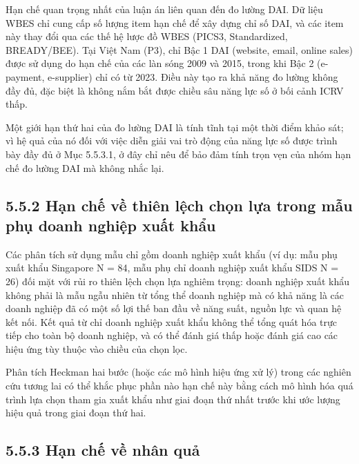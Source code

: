 \documentclass[
  a4paper,
  13pt]{extreport}
\begin{document}
Hạn chế quan trọng nhất của luận án liên quan đến đo lường DAI. Dữ liệu
WBES chỉ cung cấp số lượng item hạn chế để xây dựng chỉ số DAI, và các
item này thay đổi qua các thế hệ lược đồ WBES (PICS3, Standardized,
BREADY/BEE). Tại Việt Nam (P3), chỉ Bậc 1 DAI (website, email, online
sales) được sử dụng do hạn chế của các làn sóng 2009 và 2015, trong khi
Bậc 2 (e-payment, e-supplier) chỉ có từ 2023. Điều này tạo ra khả năng
đo lường không đầy đủ, đặc biệt là không nắm bắt được chiều sâu năng lực
số ở bối cảnh ICRV thấp.

Một giới hạn thứ hai của đo lường DAI là tính tĩnh tại một thời điểm
khảo sát; vì hệ quả của nó đối với việc diễn giải vai trò động của năng
lực số được trình bày đầy đủ ở Mục 5.5.3.1, ở đây chỉ nêu để bảo đảm
tính trọn vẹn của nhóm hạn chế đo lường DAI mà không nhắc lại.

\hypertarget{hux1ea1n-chux1ebf-vux1ec1-thiuxean-lux1ec7ch-chux1ecdn-lux1ef1a-trong-mux1eabu-phux1ee5-doanh-nghiux1ec7p-xuux1ea5t-khux1ea9u}{%
\subsection{5.5.2 Hạn chế về thiên lệch chọn lựa trong mẫu phụ doanh
nghiệp xuất
khẩu}\label{hux1ea1n-chux1ebf-vux1ec1-thiuxean-lux1ec7ch-chux1ecdn-lux1ef1a-trong-mux1eabu-phux1ee5-doanh-nghiux1ec7p-xuux1ea5t-khux1ea9u}}

Các phân tích sử dụng mẫu chỉ gồm doanh nghiệp xuất khẩu (ví dụ: mẫu phụ
xuất khẩu Singapore N = 84, mẫu phụ chỉ doanh nghiệp xuất khẩu SIDS N =
26) đối mặt với rủi ro thiên lệch chọn lựa nghiêm trọng: doanh nghiệp
xuất khẩu không phải là mẫu ngẫu nhiên từ tổng thể doanh nghiệp mà có
khả năng là các doanh nghiệp đã có một số lợi thế ban đầu về năng suất,
nguồn lực và quan hệ kết nối. Kết quả từ chỉ doanh nghiệp xuất khẩu
không thể tổng quát hóa trực tiếp cho toàn bộ doanh nghiệp, và có thể
đánh giá thấp hoặc đánh giá cao các hiệu ứng tùy thuộc vào chiều của
chọn lọc.

Phân tích Heckman hai bước (hoặc các mô hình hiệu ứng xử lý) trong các
nghiên cứu tương lai có thể khắc phục phần nào hạn chế này bằng cách mô
hình hóa quá trình lựa chọn tham gia xuất khẩu như giai đoạn thứ nhất
trước khi ước lượng hiệu quả trong giai đoạn thứ hai.

\hypertarget{hux1ea1n-chux1ebf-vux1ec1-nhuxe2n-quux1ea3}{%
\subsection{5.5.3 Hạn chế về nhân
quả}\label{hux1ea1n-chux1ebf-vux1ec1-nhuxe2n-quux1ea3}}
\end{document}
